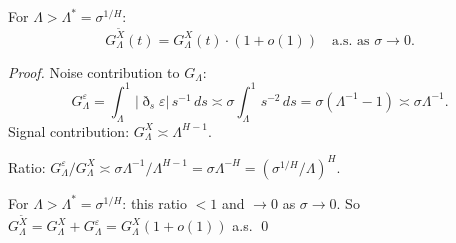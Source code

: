 \documentclass[10pt,a4paper]{amsart}
\newcommand{\GL}{G_\Lambda}
\begin{document}
\begin{lemma}\label{lem:noise}
For $\Lambda>\Lambda^*=\sigma^{1/H}$:
\[
  G_\Lambda^{\tilde X}(t) = G_\Lambda^X(t)\cdot(1+o(1))
  \quad\text{a.s.\ as }\sigma\to0.
\]
\end{lemma}

\begin{proof}
Noise contribution to $\GL$:
\[
  G_\Lambda^\varepsilon = \int_\Lambda^1|\eth_s\varepsilon|\,s^{-1}\,ds
  \asymp\sigma\int_\Lambda^1 s^{-2}\,ds = \sigma(\Lambda^{-1}-1)
  \asymp\sigma\Lambda^{-1}.
\]
Signal contribution: $G_\Lambda^X\asymp\Lambda^{H-1}$.

Ratio: $G_\Lambda^\varepsilon/G_\Lambda^X\asymp\sigma\Lambda^{-1}/\Lambda^{H-1}
=\sigma\Lambda^{-H}=(\sigma^{1/H}/\Lambda)^H$.

For $\Lambda>\Lambda^*=\sigma^{1/H}$: this ratio $<1$ and $\to0$ as
$\sigma\to0$. So $G_\Lambda^{\tilde X}=G_\Lambda^X+G_\Lambda^\varepsilon
=G_\Lambda^X(1+o(1))$ a.s. \qed
\end{proof}
\end{document}
